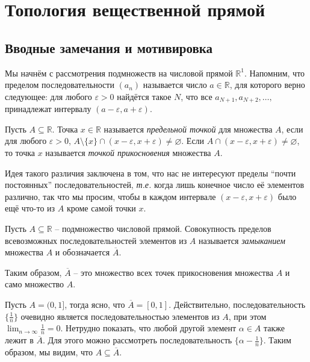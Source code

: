 \chapter{Топология вещественной прямой}


\section*{Вводные замечания и мотивировка}

Мы начнём с рассмотрения подмножеств на числовой прямой $\mathbb{R}^1$. Напомним, что пределом последовательности $(a_n)$ называется число $a \in \mathbb{R}$, для которого верно следующее: для любого $\varepsilon >0$ найдётся такое $N$, что все $a_{N+1}, a_{N+2}, \ldots,$ принадлежат интервалу $(a -\varepsilon, a+\varepsilon).$

\begin{definition}
    Пусть $A \subseteq \mathbb{R}$. Точка $x \in \mathbb{R}$ называется \textit{предельной точкой} для множества $A$, если для любого $\varepsilon >0$, $A\setminus \{x\} \cap (x-\varepsilon, x+\varepsilon) \ne \varnothing.$ Если $A \cap (x-\varepsilon, x+\varepsilon) \ne \varnothing$, то точка $x$ называется \textit{точкой прикосновения} множества $A.$
\end{definition}

\begin{remark}
    Идея такого различия заключена в том, что нас не интересуют пределы ``почти постоянных'' последовательностей, \textit{т.е.} когда лишь конечное число её элементов различно, так что мы просим, чтобы в каждом интервале $(x-\varepsilon, x +\varepsilon)$ было ещё что-то из $A$ кроме самой точки $x.$
\end{remark}

\begin{definition}
    Пусть $A \subseteq \mathbb{R}$ -- подмножество числовой прямой. Совокупность пределов всевозможных последовательностей элементов из $A$ называется \textit{замыканием} множества $A$ и обозначается $\overline{A}.$
\end{definition}

 Таким образом, $\overline{A}$ -- это множество всех точек прикосновения множества $A$ и само множество $A$.

\begin{example}
    Пусть $A = (0,1]$, тогда ясно, что $\overline{A} = [0,1]$. Действительно, последовательность $\{\frac{1}{n}\}$ очевидно является последовательностью элементов из $A$, при этом $\lim_{n \to \infty} \frac{1}{n} = 0$. Нетрудно показать, что любой другой элемент $\alpha \in A$ также лежит в $\overline{A}$. Для этого можно рассмотреть последовательность $\{\alpha - \frac{1}{n}\}$. Таким образом, мы видим, что $A \subseteq \overline{A}$.
\end{example}

